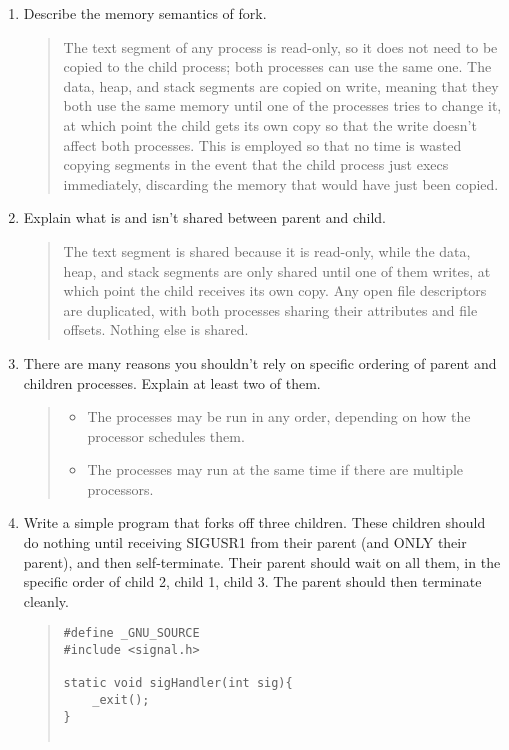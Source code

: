 \documentclass[letterpaper,10pt,onecolumn,titlepage]{article}
\begin{document}
\begin{enumerate}
\item Describe the memory semantics of fork.
\begin{quote}
The text segment of any process is read-only, so it does not need to be copied to the child process; both processes can use the same one.  The data, heap, and stack segments are copied on write, meaning that they both use the same memory until one of the processes tries to change it, at which point the child gets its own copy so that the write doesn't affect both processes.  This is employed so that no time is wasted copying segments in the event that the child process just execs immediately, discarding the memory that would have just been copied.
\end{quote}

\item Explain what is and isn't shared between parent and child.
\begin{quote}
The text segment is shared because it is read-only, while the data, heap, and stack segments are only shared until one of them writes, at which point the child receives its own copy.  Any open file descriptors are duplicated, with both processes sharing their attributes and file offsets.  Nothing else is shared.
\end{quote}

\item There are many reasons you shouldn't rely on specific ordering of parent and children processes. Explain at least two of them.
\begin{quote}
\begin{itemize}
\item The processes may be run in any order, depending on how the processor schedules them.
\item The processes may run at the same time if there are multiple processors.
\end{itemize}
\end{quote}

\item Write a simple program that forks off three children. These children should do nothing until receiving SIGUSR1 from their parent (and ONLY their parent), and then self-terminate. Their parent should wait on all them, in the specific order of child 2, child 1, child 3. The parent should then terminate cleanly.
\begin{quote}
\begin{verbatim}
#define _GNU_SOURCE
#include <signal.h>

static void sigHandler(int sig){
    _exit();
}


\end{verbatim}
\end{quote}
\end{enumerate}
\end{document}
